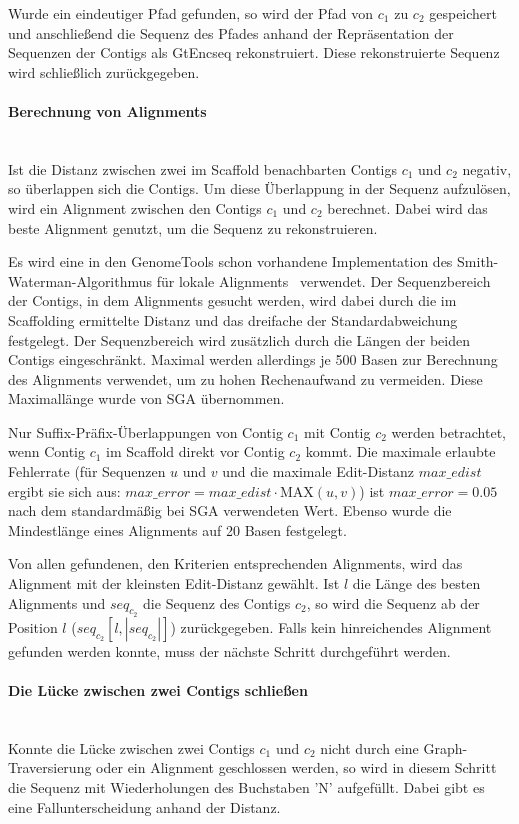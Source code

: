 \documentclass[a4paper,11pt,parskip]{scrartcl}
\begin{document}
Wurde ein eindeutiger Pfad gefunden, so wird der Pfad von $c_1$ zu
$c_2$ gespeichert und anschließend die Sequenz des Pfades anhand der
Repräsentation der Sequenzen der Contigs als GtEncseq rekonstruiert.
Diese rekonstruierte Sequenz wird schließlich zurückgegeben.

\paragraph{Berechnung von Alignments}~\\
Ist die Distanz zwischen zwei im Scaffold benachbarten Contigs $c_1$
und $c_2$ negativ, so überlappen sich die Contigs. Um diese
Überlappung in der Sequenz aufzulösen, wird ein Alignment zwischen den
Contigs $c_1$ und $c_2$ berechnet. Dabei wird das beste Alignment
genutzt, um die Sequenz zu rekonstruieren.

Es wird eine in den GenomeTools schon vorhandene Implementation des
Smith-Waterman-Algorithmus für lokale Alignments~\cite{smith}
verwendet. Der Sequenzbereich der Contigs, in dem Alignments gesucht
werden, wird dabei durch die im Scaffolding ermittelte Distanz und das
dreifache der Standardabweichung festgelegt. Der Sequenzbereich wird
zusätzlich durch die Längen der beiden Contigs eingeschränkt. Maximal
werden allerdings je 500 Basen zur Berechnung des Alignments
verwendet, um zu hohen Rechenaufwand zu vermeiden. Diese Maximallänge
wurde von SGA übernommen.

Nur Suffix-Präfix-Überlappungen von Contig $c_1$ mit Contig $c_2$
werden betrachtet, wenn Contig $c_1$ im Scaffold direkt vor Contig
$c_2$ kommt. Die maximale erlaubte Fehlerrate (für Sequenzen $u$ und
$v$ und die maximale Edit-Distanz $max\_edist$ ergibt sie sich aus:
$max\_error = max\_edist \cdot \text{MAX}(u,v)$) ist $max\_error =
0.05$ nach dem standardmäßig bei SGA verwendeten Wert. Ebenso wurde
die Mindestlänge eines Alignments auf 20 Basen festgelegt.

Von allen gefundenen, den Kriterien entsprechenden Alignments, wird das
Alignment mit der kleinsten Edit-Distanz gewählt. Ist $l$ die Länge
des besten Alignments und $seq_{c_2}$ die Sequenz des Contigs $c_2$,
so wird die Sequenz ab der Position $l$ ($seq_{c_2}[l,|seq_{c_2}|]$)
zurückgegeben. Falls kein hinreichendes Alignment gefunden werden
konnte, muss der nächste Schritt durchgeführt werden.

\paragraph{Die Lücke zwischen zwei Contigs schließen}~\\
Konnte die Lücke zwischen zwei Contigs $c_1$ und $c_2$ nicht durch
eine Graph-Traversierung oder ein Alignment geschlossen werden, so
wird in diesem Schritt die Sequenz mit Wiederholungen des Buchstaben
'N' aufgefüllt. Dabei gibt es eine Fallunterscheidung anhand der
Distanz.
\end{document}

